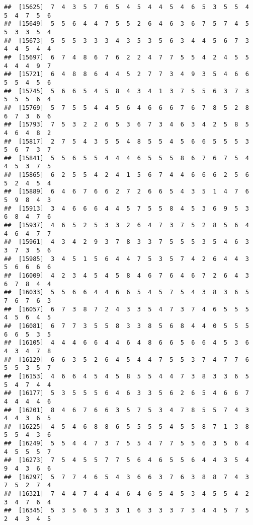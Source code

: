 \documentclass[
]{book}
\begin{document}
\begin{verbatim}
##  [15625]  7  4  3  5  7  6  5  4  5  4  4  5  4  6  5  3  5  5  4  5  4  7  5  6
##  [15649]  5  5  6  4  4  7  5  5  2  6  4  6  3  6  7  5  7  4  5  5  3  3  5  4
##  [15673]  5  5  5  3  3  3  4  3  5  3  5  6  3  4  4  5  6  7  3  4  4  5  4  4
##  [15697]  6  7  4  8  6  7  6  2  2  4  7  7  5  5  4  2  4  5  5  4  4  4  9  7
##  [15721]  6  4  8  8  6  4  4  5  2  7  7  3  4  9  3  5  4  6  6  5  5  4  5  6
##  [15745]  5  6  6  5  4  5  8  4  3  4  1  3  7  5  5  6  3  7  3  5  5  5  6  4
##  [15769]  5  7  5  5  4  4  5  6  4  6  6  6  7  6  7  8  5  2  8  6  7  3  6  6
##  [15793]  7  5  3  2  2  6  5  3  6  7  3  4  6  3  4  2  5  8  5  4  6  4  8  2
##  [15817]  2  7  5  4  3  5  5  4  8  5  5  4  5  6  6  5  5  5  3  5  6  7  3  7
##  [15841]  5  5  6  5  5  4  4  4  6  5  5  5  8  6  7  6  7  5  4  4  5  3  7  5
##  [15865]  6  2  5  5  4  2  4  1  5  6  7  4  4  6  6  6  2  5  6  5  2  4  5  4
##  [15889]  6  4  6  7  6  6  2  7  2  6  6  5  4  3  5  1  4  7  6  5  9  8  4  3
##  [15913]  3  4  6  6  6  4  4  5  7  5  5  8  4  5  3  6  9  5  3  6  8  4  7  6
##  [15937]  4  6  5  2  5  3  3  2  6  4  7  3  7  5  2  8  5  6  4  4  6  4  7  7
##  [15961]  4  3  4  2  9  3  7  8  3  3  7  5  5  5  3  5  4  6  3  3  7  3  5  6
##  [15985]  3  4  5  1  5  6  4  4  7  5  3  5  7  4  2  6  4  4  3  5  6  6  6  6
##  [16009]  4  2  3  4  5  4  5  8  4  6  7  6  4  6  7  2  6  4  3  6  7  8  4  4
##  [16033]  5  5  6  6  4  4  6  6  5  4  5  7  5  4  3  8  3  6  5  7  6  7  6  3
##  [16057]  6  7  3  8  7  2  4  3  3  5  4  7  3  7  4  6  5  5  5  4  5  6  4  5
##  [16081]  6  7  7  3  5  5  8  3  3  8  5  6  8  4  4  0  5  5  5  6  6  5  3  5
##  [16105]  4  4  4  6  6  4  4  6  4  8  6  6  5  6  6  4  5  3  6  4  3  4  7  8
##  [16129]  6  6  3  5  2  6  4  5  4  4  7  5  5  3  7  4  7  7  6  5  5  3  5  7
##  [16153]  4  6  6  4  5  4  5  8  5  5  4  4  7  3  8  3  3  6  5  5  4  7  4  4
##  [16177]  5  3  5  5  5  6  4  6  3  3  5  6  2  6  5  4  6  6  7  4  4  4  4  6
##  [16201]  8  4  6  7  6  6  3  5  7  5  3  4  7  8  5  5  7  4  3  4  4  3  6  5
##  [16225]  4  5  4  6  8  8  6  5  5  5  5  4  5  5  8  7  1  3  8  5  5  4  3  6
##  [16249]  5  5  4  4  7  3  7  5  5  4  7  7  5  5  6  3  5  6  4  4  5  5  5  7
##  [16273]  7  5  4  5  5  7  7  5  6  4  6  5  5  6  4  4  3  5  4  9  4  3  6  6
##  [16297]  5  7  7  4  6  5  4  3  6  6  3  7  6  3  8  8  7  4  3  7  5  2  7  4
##  [16321]  7  4  4  7  4  4  4  6  4  6  5  4  5  3  4  5  5  4  2  3  4  7  6  4
##  [16345]  5  3  5  6  5  3  3  1  6  3  3  3  7  3  4  4  5  7  5  2  4  3  4  5

\end{verbatim}
\end{document}
